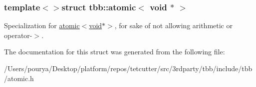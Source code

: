 \subsubsection*{template$<$$>$struct tbb\+::atomic$<$ void $\ast$ $>$}

Specialization for \hyperlink{structtbb_1_1atomic_3_01void_01_5_01_4}{atomic$<$void$\ast$$>$}, for sake of not allowing arithmetic or operator-\/$>$. 

The documentation for this struct was generated from the following file\+:\begin{DoxyCompactItemize}
\item 
/\+Users/pourya/\+Desktop/platform/repos/tetcutter/src/3rdparty/tbb/include/tbb/atomic.\+h\end{DoxyCompactItemize}
